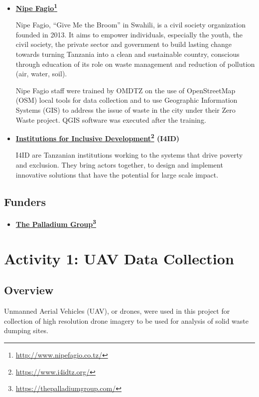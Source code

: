 \documentclass[a4paper,12pt,twoside]{article}
\begin{document}
    \begin{itemize}
        \item \textbf{\href{http://www.nipefagio.co.tz/}{Nipe Fagio}\footnote{\url{http://www.nipefagio.co.tz/}}}
    
        Nipe Fagio, “Give Me the Broom” in Swahili, is a civil society organization founded in 2013. It aims to empower individuals, especially the youth, the civil society, the private sector and government to build lasting change towards turning Tanzania into a clean and sustainable country, conscious through education of its role on waste management and reduction of pollution (air, water, soil).
    
        Nipe Fagio staff were trained by OMDTZ on the use of OpenStreetMap (OSM) local tools for data collection and to use Geographic Information Systems (GIS) to address the issue of waste in the city under their Zero Waste project. QGIS software was executed after the training.

        \item \textbf{\href{https://www.i4idtz.org/}{Institutions for Inclusive Development}\footnote{\url{https://www.i4idtz.org/}} (I4ID)}
    
        I4ID are Tanzanian institutions working to the systems that drive poverty and exclusion. They bring actors together, to design and implement innovative solutions that have the potential for large scale impact.
    
    \end{itemize}

\subsection{Funders}

    \begin{itemize}
        \item \textbf{\href{https://thepalladiumgroup.com/}{The Palladium Group}\footnote{\url{https://thepalladiumgroup.com/}}}
        
        \lipsum[0-1]
    \end{itemize}   

\section{Activity 1: UAV Data Collection}

\subsection{Overview}
    Unmanned Aerial Vehicles (UAV), or drones, were used in this project for collection of high resolution drone imagery to be used for analysis of solid waste dumping sites.
    
\end{document}
